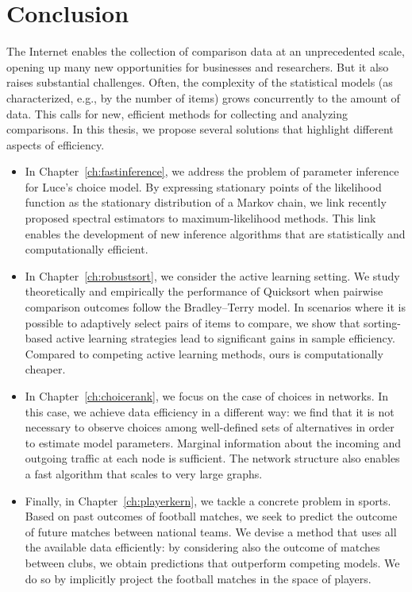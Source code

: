 \chapter{Conclusion}
\label{ch:conclusion}

The Internet enables the collection of comparison data at an unprecedented scale, opening up many new opportunities for businesses and researchers.
But it also raises substantial challenges.
Often, the complexity of the statistical models (as characterized, e.g., by the number of items) grows concurrently to the amount of data.
This calls for new, efficient methods for collecting and analyzing comparisons.
In this thesis, we propose several solutions that highlight different aspects of efficiency.

\begin{itemize}
\item In Chapter~\ref{ch:fastinference}, we address the problem of parameter inference for Luce's choice model.
By expressing stationary points of the likelihood function as the stationary distribution of a Markov chain, we link recently proposed spectral estimators to maximum-likelihood methods.
This link enables the development of new inference algorithms that are statistically and computationally efficient.

\item In Chapter~\ref{ch:robustsort}, we consider the active learning setting.
We study theoretically and empirically the performance of Quicksort when pairwise comparison outcomes follow the Bradley--Terry model.
In scenarios where it is possible to adaptively select pairs of items to compare, we show that sorting-based active learning strategies lead to significant gains in sample efficiency.
Compared to competing active learning methods, ours is computationally cheaper.

\item In Chapter~\ref{ch:choicerank}, we focus on the case of choices in networks.
In this case, we achieve data efficiency in a different way: we find that it is not necessary to observe choices among well-defined sets of alternatives in order to estimate model parameters.
Marginal information about the incoming and outgoing traffic at each node is sufficient.
The network structure also enables a fast algorithm that scales to very large graphs.

\item Finally, in Chapter~\ref{ch:playerkern}, we tackle a concrete problem in sports.
Based on past outcomes of football matches, we seek to predict the outcome of future matches between national teams.
We devise a method that uses all the available data efficiently: by considering also the outcome of matches between clubs, we obtain predictions that outperform competing models.
We do so by implicitly project the football matches in the space of players.
\end{itemize}

